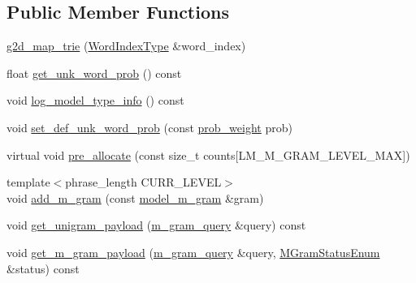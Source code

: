 \subsection*{Public Member Functions}
\begin{DoxyCompactItemize}
\item 
\hyperlink{classuva_1_1smt_1_1bpbd_1_1server_1_1lm_1_1g2d__map__trie_a7f72021ff20df2a8d313c90bd10a386f}{g2d\+\_\+map\+\_\+trie} (\hyperlink{classuva_1_1smt_1_1bpbd_1_1server_1_1lm_1_1word__index__trie__base_a64279b5b94c421b25aedaa72e73d013c}{Word\+Index\+Type} \&word\+\_\+index)
\item 
float \hyperlink{classuva_1_1smt_1_1bpbd_1_1server_1_1lm_1_1g2d__map__trie_a2864dedcf31df422ca8d002b18d33043}{get\+\_\+unk\+\_\+word\+\_\+prob} () const 
\item 
void \hyperlink{classuva_1_1smt_1_1bpbd_1_1server_1_1lm_1_1g2d__map__trie_a4d2d99897cb6688749a666638b956a4a}{log\+\_\+model\+\_\+type\+\_\+info} () const 
\item 
void \hyperlink{classuva_1_1smt_1_1bpbd_1_1server_1_1lm_1_1g2d__map__trie_a26cafa25e5c75c3d86ba484e127705ba}{set\+\_\+def\+\_\+unk\+\_\+word\+\_\+prob} (const \hyperlink{namespaceuva_1_1smt_1_1bpbd_1_1server_a01e9ea4de9c226f4464862e84ff0bbcc}{prob\+\_\+weight} prob)
\item 
virtual void \hyperlink{classuva_1_1smt_1_1bpbd_1_1server_1_1lm_1_1g2d__map__trie_a63fbfaaf6add4fc6f6da3b835e7af9c4}{pre\+\_\+allocate} (const size\+\_\+t counts\mbox{[}L\+M\+\_\+\+M\+\_\+\+G\+R\+A\+M\+\_\+\+L\+E\+V\+E\+L\+\_\+\+M\+A\+X\mbox{]})
\item 
{\footnotesize template$<$phrase\+\_\+length C\+U\+R\+R\+\_\+\+L\+E\+V\+E\+L$>$ }\\void \hyperlink{classuva_1_1smt_1_1bpbd_1_1server_1_1lm_1_1g2d__map__trie_a401d1741a5a5c5eb031eccee5e64e8c1}{add\+\_\+m\+\_\+gram} (const \hyperlink{classuva_1_1smt_1_1bpbd_1_1server_1_1lm_1_1m__grams_1_1model__m__gram}{model\+\_\+m\+\_\+gram} \&gram)
\item 
void \hyperlink{classuva_1_1smt_1_1bpbd_1_1server_1_1lm_1_1g2d__map__trie_ab5f235d39eb24318b0ba0d0f5913fabd}{get\+\_\+unigram\+\_\+payload} (\hyperlink{classuva_1_1smt_1_1bpbd_1_1server_1_1lm_1_1m__gram__query}{m\+\_\+gram\+\_\+query} \&query) const 
\item 
void \hyperlink{classuva_1_1smt_1_1bpbd_1_1server_1_1lm_1_1g2d__map__trie_ac3ecdaab55f43f3c5bc642b527dc36b5}{get\+\_\+m\+\_\+gram\+\_\+payload} (\hyperlink{classuva_1_1smt_1_1bpbd_1_1server_1_1lm_1_1m__gram__query}{m\+\_\+gram\+\_\+query} \&query, \hyperlink{namespaceuva_1_1smt_1_1bpbd_1_1server_1_1lm_ab9b3e7382b561dcb8abcd6b55e9b796a}{M\+Gram\+Status\+Enum} \&status) const 

\end{DoxyCompactItemize}
